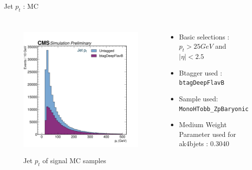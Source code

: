 \documentclass[10pt,xcolor=dvipsnames]{beamer}
\begin{document}
    
   \begin{frame}[fragile]{Jet $p_t$ : MC} 
    \begin{columns}
    \begin{figure} 
    \centering 
     \includegraphics[width=1\textwidth]{../Archive/KinemPlots/JetsMC.png }
    \label{JetMC} 
    \caption{Jet $p_t$ of signal MC samples}
    \end{figure} 
    \begin{itemize} 
    \raggedright 
    \small
    \item Basic selections : $p_t > 25 GeV $ and $|\eta | < 2.5 $
    \item {Btagger used : \texttt{btagDeepFlavB}} 
    \item {Sample used: \texttt{MonoHTobb\_ZpBaryonic}} 
    \item Medium Weight Parameter used for ak4bjets : 0.3040  
    \end{itemize}
    \end{columns} 
    \end{frame} 
    
\end{document}
